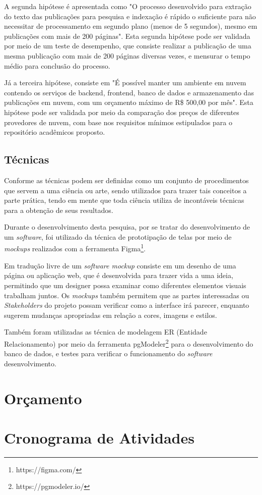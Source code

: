 A segunda hipótese é apresentada como "O processo desenvolvido
para extração do texto das publicações para pesquisa e indexação
é rápido o suficiente para não necessitar de processamento em
segundo plano (menos de 5 segundos), mesmo em publicações com mais
de 200 páginas". Esta segunda hipótese pode ser validada por meio
de um teste de desempenho, que consiste realizar a publicação de uma
mesma publicação com mais de 200 páginas diversas vezes, e mensurar
o tempo médio para conclusão do processo.

Já a terceira hipótese, consiste em "É possível manter um ambiente
em nuvem contendo os serviços de backend, frontend, banco de dados
e armazenamento das publicações em nuvem, com um orçamento máximo
de R\$ 500,00 por mês". Esta hipótese pode ser validada por meio
da comparação dos preços de diferentes provedores de nuvem, com
base nos requisitos mínimos estipulados para o repositório
acadêmicos proposto.

\subsection{Técnicas}

Conforme \citep[p. 174]{LAKATOS:metodologia} as técnicas podem
ser definidas como um conjunto de procedimentos que servem a
uma ciência ou arte, sendo utilizados para trazer tais
conceitos a parte prática, tendo em mente que toda ciência utiliza
de incontáveis técnicas para a obtenção de seus resultados.

Durante o desenvolvimento desta pesquisa, por se tratar do
desenvolvimento de um \emph{software}, foi utilizado da técnica
de prototipação de telas por meio de \emph{mockups} realizados
com a ferramenta Figma\footnote{https://figma.com/}.

Em tradução livre de \cite{uzayr:mockups} um \emph{software mockup}
consiste em um desenho de uma página ou aplicação web,
que é desenvolvida para trazer vida a uma ideia, permitindo
que um designer possa examinar como diferentes elementos visuais
trabalham juntos. Os \emph{mockups} também permitem que as partes
interessadas ou \emph{Stakeholders} do projeto possam verificar como a
interface irá parecer, enquanto sugerem mudanças
apropriadas em relação a cores, imagens e estilos.

Também foram utilizadas as técnica de modelagem ER (Entidade Relacionamento)
por meio da ferramenta pgModeler\footnote{https://pgmodeler.io/} para
o desenvolvimento do banco de dados, e testes para verificar o funcionamento
do \emph{software} desenvolvimento.

\section{Orçamento} \label{sec:budget}


\section{Cronograma de Atividades} \label{sec:schedule_activities_table}

